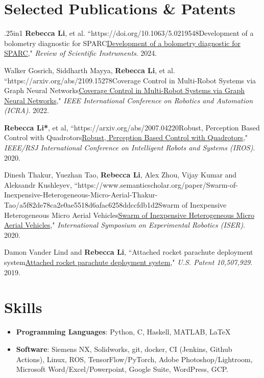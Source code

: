 \documentclass[letterpaper,11pt]{article}
\def\CC{{C\nolinebreak[4]\hspace{-.05em}\raisebox{.4ex}{\tiny\bf ++}}}
\newcommand{\resumeSubHeadingListStart}{\begin{itemize}[leftmargin=*]}
\newcommand{\resumeSubHeadingListEnd}{\end{itemize}}
\newcommand{\resumeItem}[2]{
	\item[]\small{
		\textbf{#1}{: #2 \vspace{-2pt}}
	}
}
\newcommand{\resumeSubItem}[2]{\resumeItem{#1}{#2}\vspace{-5pt}}
\newcommand{\resumePublication}[5]{%
	\setlength{\leftskip}{0.5cm}%
	\small
	#1 ``\ifx\relax#3\relax #2\else\href{#3}{#2}\fi," \textit{#4}. #5.

	\vspace{0.25em}
}
\newcommand{\resumeSkill}[2]{\resumeSubItem{#1}{#2}}
\begin{document}
\section{Selected Publications \& Patents}
\begin{hangparas}{.25in}{1}
%
\resumePublication
{\textbf{Rebecca Li}, et al.}
{Development of a bolometry diagnostic for SPARC}
{https://doi.org/10.1063/5.0219548}
{Review of Scientific Instruments}
{2024}

\resumePublication
{Walker Gosrich, Siddharth Mayya, \textbf{Rebecca Li}, et al.}
{Coverage Control in Multi-Robot Systems via Graph Neural Networks}
{https://arxiv.org/abs/2109.15278}
{IEEE International Conference on Robotics and Automation (ICRA)}
{2022}

\resumePublication
{\textbf{Rebecca Li*}, et al,}
{Robust, Perception Based Control with Quadrotors}
{https://arxiv.org/abs/2007.04220}
{IEEE/RSJ International Conference on Intelligent Robots and Systems (IROS)}
{2020}

\resumePublication
{Dinesh Thakur, Yuezhan Tao, \textbf{Rebecca Li}, Alex Zhou, Vijay Kumar and Aleksandr Kushleyev,}
{Swarm of Inexpensive Heterogeneous Micro Aerial Vehicles}
{https://www.semanticscholar.org/paper/Swarm-of-Inexpensive-Heterogeneous-Micro-Aerial-Thakur-Tao/a5f82de78ca2e0ae5518d6afac6258ddccfdb1d2}
{International Symposium on Experimental Robotics (ISER)}
{2020}

\resumePublication
{Damon Vander Lind and \textbf{Rebecca Li},}
{Attached rocket parachute deployment system}
{}
{U.S. Patent 10,507,929}
{2019}

\end{hangparas}
\vspace{0.5em}

\section{Skills}
\resumeSubHeadingListStart
%
\resumeSkill
{Programming Languages}
{Python, \CC, Haskell, MATLAB, \LaTeX}

\resumeSkill
{Software}
{Siemens NX, Solidworks, git, docker, CI (Jenkins, Github Actions), Linux, ROS, TensorFlow/PyTorch, Adobe Photoshop/Lightroom, Microsoft Word/Excel/Powerpoint, Google Suite, WordPress, GCP.}
\resumeSubHeadingListEnd

\end{document}
